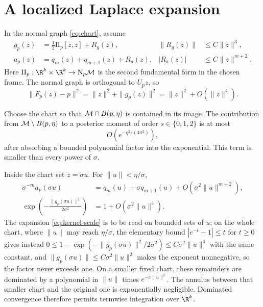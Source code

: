 \section{A localized Laplace expansion}
\label{app:laplace}

In the normal graph \eqref{eq:chart}, assume
\begin{align}
  g_p(z)&=\tfrac12\mathrm{II}_p[z,z]+R_g(z),
  &\|R_g(z)\|&\le C\|z\|^3,\label{eq:normal-exp}\\
  a_p(z)&=q_m(z)+q_{m+1}(z)+R_a(z),
  &|R_a(z)|&\le C\|z\|^{m+2}.\label{eq:density-exp-app}
\end{align}
Here $\mathrm{II}_p:\R^k\times\R^k\to\N_p\M$ is the second fundamental form in the chosen frame.  The normal graph is orthogonal to $U_pz$, so
\begin{equation}
  \|F_p(z)-p\|^2=\|z\|^2+\|g_p(z)\|^2
  =\|z\|^2+O(\|z\|^4).
  \label{eq:distance-exp}
\end{equation}

Choose the chart so that $\mathcal{M}\cap B(p,\eta)$ is contained in its image.  The contribution from $\mathcal{M}\setminus B(p,\eta)$ to a posterior moment of order $s\in\{0,1,2\}$ is at most
\begin{equation}
  O\!\left(e^{-\eta^2/(4\sigma^2)}\right),
  \label{eq:tail-localization}
\end{equation}
after absorbing a bounded polynomial factor into the exponential.  This term is smaller than every power of $\sigma$.

Inside the chart set $z=\sigma u$.  For $\|u\|<\eta/\sigma$,
\begin{align}
  \sigma^{-m}a_p(\sigma u)
  &=q_m(u)+\sigma q_{m+1}(u)
    +O(\sigma^2\|u\|^{m+2}),\label{eq:density-scale}\\
  \exp\!\left(-\frac{\|g_p(\sigma u)\|^2}{2\sigma^2}\right)
  &=1+O(\sigma^2\|u\|^4).\label{eq:kernel-scale}
\end{align}
The expansion \eqref{eq:kernel-scale} is to be read on bounded sets of $u$; on the whole chart, where $\|u\|$ may reach $\eta/\sigma$, the elementary bound $|e^{-t}-1|\le t$ for $t\ge0$ gives instead $0\le1-\exp(-\|g_p(\sigma u)\|^2/2\sigma^2)\le C\sigma^2\|u\|^4$ with the same constant, and $\|g_p(\sigma u)\|\le C\sigma^2\|u\|^2$ makes the exponent nonnegative, so the factor never exceeds one.  On a smaller fixed chart, these remainders are dominated by a polynomial in $\|u\|$ times $e^{-c\|u\|^2}$.  The annulus between that smaller chart and the original one is exponentially negligible.  Dominated convergence therefore permits termwise integration over $\R^k$.


